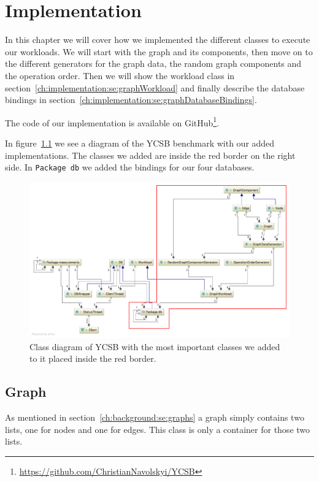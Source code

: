 \chapter{Implementation}
\label{ch:implementation}
In this chapter we will cover how we implemented the different classes to execute our workloads.
We will start with the graph and its components,
then move on to the different generators for the graph data,
the random graph components and the operation order.
Then we will show the workload class in section~\ref{ch:implementation:se:graphWorkload} and finally describe the database bindings in section~\ref{ch:implementation:se:graphDatabaseBindings}.

The code of our implementation is available on GitHub\footnote{\url{https://github.com/ChristianNavolskyi/YCSB}}.

In figure~\ref{fig:YCSBExtension} we see a diagram of the YCSB benchmark with our added implementations.
The classes we added are inside the red border on the right side.
In \texttt{Package db} we added the bindings for our four databases.

\begin{figure}
  \includegraphics[angle=90,height=\textheight]{images/benchmarks/extendedYCSBWorkflow}
  \caption{Class diagram of YCSB with the most important classes we added to it placed inside the red border.}
  \label{fig:YCSBExtension}
\end{figure}

\section{Graph}
As mentioned in section~\ref{ch:background:se:graphs} a graph simply contains two lists,
one for nodes and one for edges.
This class is only a container for those two lists.

